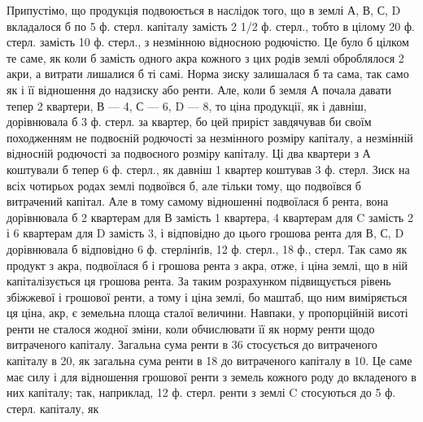 Припустімо, що продукція подвоюється в наслідок того, що в землі А,
В, С, D вкладалося б по 5 ф. стерл. капіталу замість 2 1/2 ф. стерл., тобто
в цілому 20 ф. стерл. замість 10 ф. стерл., з незмінною відносною родючістю.
Це було б цілком те саме, як коли б замість одного акра кожного з цих
родів землі оброблялося 2 акри, а витрати лишалися б ті самі. Норма зиску
залишалася б та сама, так само як і її відношення до надзиску або ренти. Але,
коли б земля А почала давати тепер 2 квартери, В — 4, С — 6, D — 8, то ціна
продукції, як і давніш, дорівнювала б 3 ф. стерл. за квартер, бо цей приріст
завдячував би своїм походженням не подвоєній родючості за незмінного розміру
капіталу, а незмінній відносній родючості за подвоєного розміру капіталу. Ці
два квартери з А коштували б тепер 6 ф. стерл., як давніш 1 квартер коштував
3 ф. стерл. Зиск на всіх чотирьох родах землі подвоївся б, але тільки
тому, що подвоївся б витрачений капітал. Але в тому самому відношенні подвоїлася
б рента, вона дорівнювала б 2 квартерам для В замість 1 квартера, 4 квартерам
для C замість 2 і 6 квартерам для D замість 3, і відповідно до цього
грошова рента для В, С, D дорівнювала б відповідно 6 ф. стерлінґів, 12 ф.
стерл., 18 ф., стерл. Так само як продукт з акра, подвоїлася б і грошова
рента з акра, отже, і ціна землі, що в ній капіталізується ця грошова рента. За
таким розрахунком підвищується рівень збіжжевої і грошової ренти, а тому і
ціна землі, бо маштаб, що ним виміряється ця ціна, акр, є земельна площа
сталої величини. Навпаки, у пропорційній висоті ренти не сталося жодної зміни,
коли обчислювати її як норму ренти щодо витраченого капіталу. Загальна сума
ренти в 36 стосується до витраченого капіталу в 20, як загальна сума ренти
в 18 до витраченого капіталу в 10. Це саме має силу і для відношення грошової
ренти з земель кожного роду до вкладеного в них капіталу; так, наприклад,
12 ф. стерл. ренти з землі C стосуються до 5 ф. стерл. капіталу, як
\parbreak{}  %
